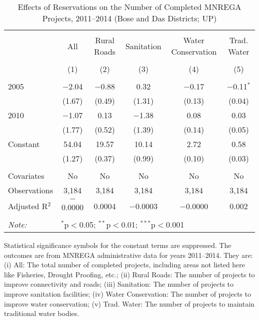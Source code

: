 \begin{table}[!htbp]
\centering
\begin{threeparttable}

  \caption{Effects of Reservations on the Number of Completed MNREGA Projects, 2011--2014 (Bose and Das Districts; UP)} 
  \label{mnrega_up_bd_districts_05_10} 
\scriptsize 
\begin{tabular}{@{\extracolsep{0pt}}lccccc} 
\\[-1.8ex]\hline 
\hline \\[-1.8ex] 
 & All & Rural Roads & Sanitation & Water Conservation & Trad. Water \\ 
\\[-1.8ex] & (1) & (2) & (3) & (4) & (5)\\ 
\hline \\[-1.8ex] 
 2005 & $-$2.04 & $-$0.88 & 0.32 & $-$0.17 & $-$0.11$^{*}$ \\ 
  & (1.67) & (0.49) & (1.31) & (0.13) & (0.04) \\ 
  2010 & $-$1.07 & 0.13 & $-$1.38 & 0.08 & 0.03 \\ 
  & (1.77) & (0.52) & (1.39) & (0.14) & (0.05) \\ 
  Constant & 54.04 & 19.57 & 10.14 & 2.72 & 0.58 \\ 
  & (1.27) & (0.37) & (0.99) & (0.10) & (0.03) \\ 
 \hline \\[-1.8ex] 
Covariates & No & No & No & No & No \\ 
Observations & 3,184 & 3,184 & 3,184 & 3,184 & 3,184 \\ 
Adjusted R$^{2}$ & $-$0.0000 & 0.0004 & $-$0.0003 & $-$0.0000 & 0.002 \\ 
\hline 
\hline \\[-1.8ex] 
\textit{Note:}  & \multicolumn{5}{l}{$^{*}$p$<$0.05; $^{**}$p$<$0.01; $^{***}$p$<$0.001} \\ 
\end{tabular} 
\begin{tablenotes}[flushleft]
\scriptsize
\item Statistical significance symbols for the constant terms are suppressed. The outcomes are from MNREGA administrative data for years 2011--2014. They are: 
(i) All: The total number of completed projects, including areas not listed here like Fisheries, Drought Proofing, etc.;
(ii) Rural Roads: The number of projects to improve connectivity and roads;
(iii) Sanitation: The number of projects to improve sanitation facilities;
(iv) Water Conservation: The number of projects to improve water conservation;
(v) Trad. Water: The number of projects to maintain traditional water bodies.
\end{tablenotes}
\end{threeparttable}
\end{table}
